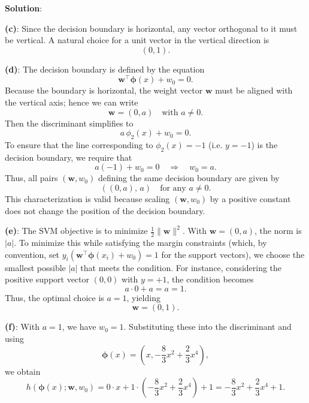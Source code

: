 \documentclass[submit]{../harvardml}
\newenvironment{solution}{
    \vspace{2mm}
    \color{blue}\noindent\textbf{Solution}:
}{}
\begin{document}
\begin{solution}
\textbf{(c)}: Since the decision boundary is horizontal, any vector orthogonal to it must be vertical. A natural choice for a unit vector in the vertical direction is
\[
(0,1).
\]

\textbf{(d)}: The decision boundary is defined by the equation
\[
\mathbf{w}^\top\boldsymbol{\phi}(x) + w_0 = 0.
\]
Because the boundary is horizontal, the weight vector $\mathbf{w}$ must be aligned with the vertical axis; hence we can write 
\[
\mathbf{w} = (0,a) \quad \text{with } a\neq 0.
\]
Then the discriminant simplifies to
\[
a\,\phi_2(x) + w_0 = 0.
\]
To ensure that the line corresponding to $\phi_2(x)=-1$ (i.e. $y=-1$) is the decision boundary, we require that
\[
a(-1) + w_0 = 0 \quad \Longrightarrow \quad w_0 = a.
\]
Thus, all pairs $(\mathbf{w},w_0)$ defining the same decision boundary are given by
\[
\left( (0,a),\, a \right) \quad \text{for any } a\neq 0.
\]
This characterization is valid because scaling $(\mathbf{w},w_0)$ by a positive constant does not change the position of the decision boundary.

\textbf{(e)}: The SVM objective is to minimize $\tfrac{1}{2}\|\mathbf{w}\|^2$. With $\mathbf{w}=(0,a)$, the norm is $|a|$. To minimize this while satisfying the margin constraints (which, by convention, set $y_i\left(\mathbf{w}^\top\boldsymbol{\phi}(x_i)+w_0\right)=1$ for the support vectors), we choose the smallest possible $|a|$ that meets the condition. For instance, considering the positive support vector $(0,0)$ with $y=+1$, the condition becomes
\[
a\cdot 0 + a = a = 1.
\]
Thus, the optimal choice is $a=1$, yielding
\[
\mathbf{w} = (0,1).
\]

\textbf{(f)}: With $a=1$, we have $w_0 = 1$. Substituting these into the discriminant and using 
\[
\boldsymbol{\phi}(x)=\left(x, -\frac{8}{3}x^2+\frac{2}{3}x^4\right),
\]
we obtain
\[
h(\boldsymbol{\phi}(x);\mathbf{w},w_0) = 0\cdot x + 1\cdot\left(-\frac{8}{3}x^2+\frac{2}{3}x^4\right) + 1 
= -\frac{8}{3}x^2+\frac{2}{3}x^4 + 1.
\]


\end{solution}
\end{document}
